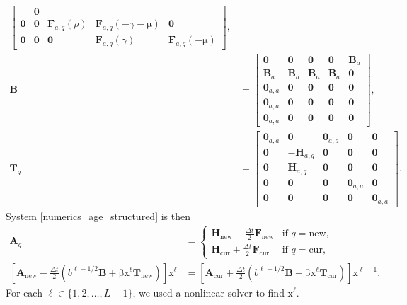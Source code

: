 \documentclass[USenglish]{article}
\renewcommand{\vec}[1]{\boldsymbol{\mathrm{#1}}}
\newcommand{\mat}[1]{\mathbf{#1}}
\begin{document}
\begin{subequations}
\begin{align}
\begin{bmatrix}
      & \mat{0}
      \\
      \mat{0} & \mat{0} & \mat{F}_{a, q}(\rho)
      & \mat{F}_{a, q}(- \gamma - \vec{\mu}) & \mat{0}
      \\
      \mat{0} & \mat{0} & \mat{0} & \mat{F}_{a, q}(\gamma)
      & \mat{F}_{a, q}(- \vec{\mu})
    \end{bmatrix},
    \\
    \mat{B} &=
    \begin{bmatrix}
      \mat{0} & \mat{0} & \mat{0} & \mat{0} & \mat{B}_a
      \\
      \mat{B}_a & \mat{B}_a & \mat{B}_a & \mat{B}_a & \mat{0}
      \\
      \mat{0}_{a,a} & \mat{0} & \mat{0} & \mat{0} & \mat{0}
      \\
      \mat{0}_{a,a} & \mat{0} & \mat{0} & \mat{0} & \mat{0}
      \\
      \mat{0}_{a,a} & \mat{0} & \mat{0} & \mat{0} & \mat{0}
    \end{bmatrix},
    \\
    \mat{T}_q &=
    \begin{bmatrix}
      \mat{0}_{a,a} & \mat{0} & \mat{0}_{a,a} & \mat{0} & \mat{0}
      \\
      \mat{0} & - \mat{H}_{a, q} & \mat{0} & \mat{0} & \mat{0}
      \\
      \mat{0} & \mat{H}_{a, q} & \mat{0} & \mat{0} & \mat{0}
      \\
      \mat{0} & \mat{0} & \mat{0} & \mat{0}_{a,a} & \mat{0}
      \\
      \mat{0} & \mat{0} & \mat{0} & \mat{0} & \mat{0}_{a,a}
    \end{bmatrix}.
  \end{align}
\end{subequations}
System \eqref{numerics_age_structured} is then
\begin{subequations}
  \label{step_age_structured}
  \begin{align}
    \mat{A}_q &=
    \begin{cases}
      \mat{H}_{\mathrm{new}} - \frac{\Delta t}{2} \mat{F}_{\mathrm{new}}
      & \text{if $q = \mathrm{new}$},
      \\
      \mat{H}_{\mathrm{cur}} + \frac{\Delta t}{2} \mat{F}_{\mathrm{cur}}
      & \text{if $q = \mathrm{cur}$},
    \end{cases}
    \\
    \left[
      \mat{A}_{\mathrm{new}}
      - \frac{\Delta t}{2} \left(
        b^{\ell - 1 / 2} \mat{B}
        + \vec{\beta} \vec{x}^{\ell} \mat{T}_{\mathrm{new}}
      \right)
    \right]
    \vec{x}^{\ell} &=
    \left[
      \mat{A}_{\mathrm{cur}}
      + \frac{\Delta t}{2} \left(
        b^{\ell - 1 / 2} \mat{B}
        + \vec{\beta} \vec{x}^{\ell} \mat{T}_{\mathrm{cur}}
      \right)
    \right]
    \vec{x}^{\ell - 1}.
  \end{align}
\end{subequations}
For each $\ell \in \{1, 2, \ldots, L - 1\}$, we used a nonlinear
solver to find $\vec{x}^{\ell}$.
\end{document}
